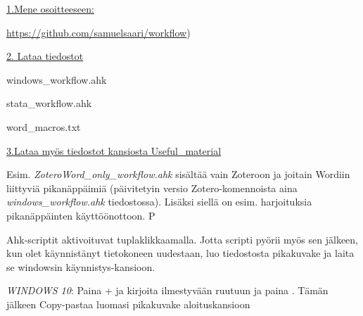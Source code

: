 \documentclass[a4paper,12pt]{scrartcl}
\newcommand*{\mybox}[1]{\framebox{#1}}
\begin{document}
\begin{framed}
	
	\underline{1.Mene osoitteeseen:}
	
	\url{https://github.com/samuelsaari/workflow})
	
	\medskip
	
	\underline{2. Lataa tiedostot}
	
	windows\_workflow.ahk
	
	stata\_workflow.ahk
	
	word\_macros.txt
	
	\medskip
	
	\underline{3.Lataa myös tiedostot kansiosta Useful\_material}
	
	Esim. \emph{ZoteroWord\_only\_workflow.ahk} sisältää vain Zoteroon ja joitain Wordiin liittyviä pikanäppäimiä (päivitetyin versio Zotero-komennoista aina \emph{windows\_workflow.ahk} tiedostossa). Lisäksi siellä on esim. harjoituksia pikanäppäinten käyttöönottoon. P
	
	
	
\end{framed}


\medskip

Ahk-scriptit aktivoituvat tuplaklikkaamalla. Jotta scripti pyörii myös sen jälkeen, kun olet käynnistänyt tietokoneen uudestaan, luo tiedostosta pikakuvake ja laita se windowsin käynnistys-kansioon.

\medskip

\emph{WINDOWS 10}: Paina + ja kirjoita ilmestyvään ruutuun \mybox{shell::startup} ja paina \keys{\return}. Tämän jälkeen Copy-pastaa luomasi pikakuvake aloituskansioon

\medskip



\end{document}
